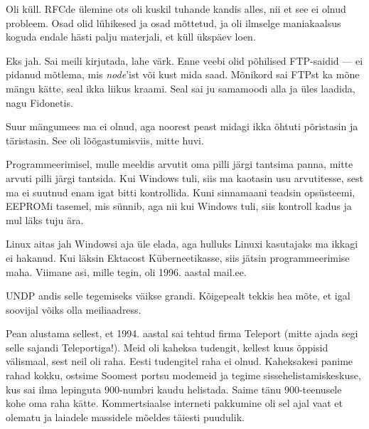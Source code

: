 
Oli küll. RFCde ülemine ots oli kuskil tuhande kandis alles, nii et see ei olnud 
probleem. Osad olid lühikesed ja osad mõttetud, ja oli ilmselge maniakaalsus 
koguda endale hästi palju materjali, et küll ükspäev loen.


Eks jah. Sai meili kirjutada, lahe värk. Enne veebi olid 
põhilised FTP-saidid --- ei pidanud mõtlema, mis \emph{node}'ist või kust 
mida saad. Mõnikord sai FTPst ka mõne mängu kätte, seal ikka liikus kraami. 
Seal sai ju samamoodi alla ja üles laadida, nagu Fidonetis. 


Suur mängumees ma ei olnud, aga noorest peast midagi ikka õhtuti põristasin 
ja täristasin. See oli lõõgastumisviis, mitte huvi. 


Programmeerimisel, mulle meeldis arvutit oma pilli järgi tantsima panna, mitte 
arvuti pilli järgi tantsida. Kui Windows tuli, 
siis ma kaotasin usu arvutitesse, sest ma ei suutnud enam igat 
bitti kontrollida. Kuni sinnamaani teadsin opsüsteemi, EEPROMi 
tasemel, mis sünnib, aga nii kui Windows tuli, siis kontroll kadus ja mul läks tuju ära.


Linux aitas jah Windowsi aja üle elada, aga hulluks 
Linuxi kasutajaks ma ikkagi ei hakanud. Kui läksin 
Ektacost Küberneetikasse, siis jätsin programmeerimise maha. Viimane asi, mille 
tegin, oli 1996. aastal mail.ee. 


UNDP andis selle tegemiseks väikse grandi.
Kõigepealt tekkis hea mõte, et igal soovijal võiks olla meiliaadress. 

Pean alustama sellest, et 1994. aastal sai tehtud 
firma Teleport (mitte ajada segi selle sajandi 
Teleportiga!). Meid oli kaheksa tudengit, kellest kuus õppisid välismaal, sest 
neil oli raha. Eesti tudengitel raha ei olnud. Kaheksakesi panime rahad 
kokku, ostsime Soomest portsu modemeid ja tegime sissehelistamiskeskuse, kus 
sai ilma lepinguta 900-numbri kaudu helistada. Saime 
tänu 900-teenusele kohe oma raha kätte. Kommertsiaalse interneti pakkumine oli sel 
ajal vaat et olematu ja laiadele massidele mõeldes täiesti 
puudulik. 

